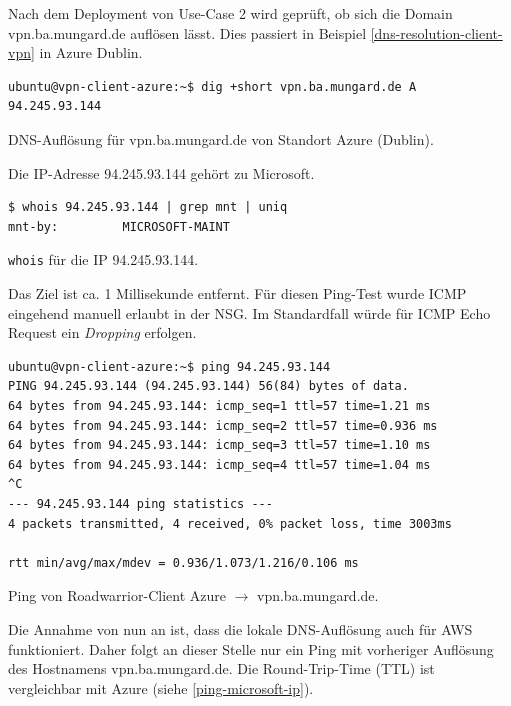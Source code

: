 Nach dem Deployment von Use-Case 2 wird geprüft, ob sich die Domain vpn.ba.mungard.de auflösen lässt. Dies passiert in Beispiel \ref{dns-resolution-client-vpn} in Azure Dublin.
\begin{listing}[h]
\begin{verbatim}
ubuntu@vpn-client-azure:~$ dig +short vpn.ba.mungard.de A
94.245.93.144

\end{verbatim}
\caption{DNS-Auflösung für vpn.ba.mungard.de von Standort Azure (Dublin).}
\label{dns-resolution-client-vpn}
\end{listing}\FloatBarrier
Die IP-Adresse 94.245.93.144 gehört zu Microsoft.
\begin{listing}[h]
\begin{verbatim}
$ whois 94.245.93.144 | grep mnt | uniq
mnt-by:         MICROSOFT-MAINT

\end{verbatim}
\caption{\texttt{whois} für die IP 94.245.93.144.}
\label{whois-microsoft-ip}
\end{listing}\FloatBarrier
Das Ziel ist ca. 1 Millisekunde entfernt. Für diesen Ping-Test wurde ICMP eingehend manuell erlaubt in der NSG. Im Standardfall würde für ICMP Echo Request ein \textit{Dropping} erfolgen.
\begin{listing}[h]
\begin{verbatim}
ubuntu@vpn-client-azure:~$ ping 94.245.93.144
PING 94.245.93.144 (94.245.93.144) 56(84) bytes of data.
64 bytes from 94.245.93.144: icmp_seq=1 ttl=57 time=1.21 ms
64 bytes from 94.245.93.144: icmp_seq=2 ttl=57 time=0.936 ms
64 bytes from 94.245.93.144: icmp_seq=3 ttl=57 time=1.10 ms
64 bytes from 94.245.93.144: icmp_seq=4 ttl=57 time=1.04 ms
^C
--- 94.245.93.144 ping statistics ---
4 packets transmitted, 4 received, 0% packet loss, time 3003ms

rtt min/avg/max/mdev = 0.936/1.073/1.216/0.106 ms

\end{verbatim}
\caption{Ping von Roadwarrior-Client Azure $\rightarrow$ vpn.ba.mungard.de.}
\label{ping-microsoft-ip}
\end{listing}\FloatBarrier
Die Annahme von nun an ist, dass die lokale DNS-Auflösung auch für AWS funktioniert. Daher folgt an dieser Stelle nur ein Ping mit vorheriger Auflösung des Hostnamens vpn.ba.mungard.de. Die Round-Trip-Time (TTL) ist vergleichbar mit Azure (siehe \ref{ping-microsoft-ip}).

